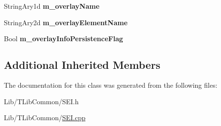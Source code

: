 \begin{DoxyCompactItemize}
\mbox{\label{class_s_e_i_overlay_info_ac3f815b3f95fb5a1e8f8b054e2369709}} 
String\+Ary1d {\bfseries m\+\_\+overlay\+Name}
\item 
\mbox{\label{class_s_e_i_overlay_info_ad9945cd5068f675c2de265a4c2e9b192}} 
String\+Ary2d {\bfseries m\+\_\+overlay\+Element\+Name}
\item 
\mbox{\label{class_s_e_i_overlay_info_a691af3ebabd60c97a72e35ffb6a10053}} 
Bool {\bfseries m\+\_\+overlay\+Info\+Persistence\+Flag}
\end{DoxyCompactItemize}
\subsection*{Additional Inherited Members}


The documentation for this class was generated from the following files\+:\begin{DoxyCompactItemize}
\item 
Lib/\+T\+Lib\+Common/S\+E\+I.\+h\item 
Lib/\+T\+Lib\+Common/\hyperlink{_s_e_i_8cpp}{S\+E\+I.\+cpp}\end{DoxyCompactItemize}
